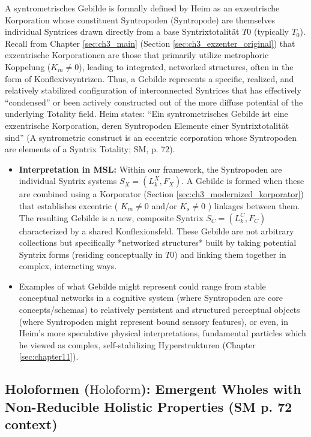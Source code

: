\documentclass[
    12pt,              %
    a4paper,           %
    headings=normal,   %
    twoside=true,      %
    BCOR=8mm,          %
]{scrbook}
\newcommand{\q}[1]{\enquote{#1}}
\newcommand{\syntropode}{\text{Syntropode}}
\newcommand{\syntrixtotalitaet}{T0}
\newcommand{\holoform}{\text{Holoform}}
\begin{document}
A syntrometrisches Gebilde is formally defined by Heim as an exzentrische Korporation whose constituent Syntropoden (\(\syntropode\)) are themselves individual Syntrices drawn directly from a base Syntrixtotalität \(\syntrixtotalitaet\) (typically \(T_0\)). Recall from Chapter \ref{sec:ch3_main} (Section \ref{sec:ch3_exzenter_original}) that exzentrische Korporationen are those that primarily utilize metrophoric Koppelung (\(K_m \neq 0\)), leading to integrated, networked structures, often in the form of Konflexivsyntrizen.
Thus, a Gebilde represents a specific, realized, and relatively stabilized configuration of interconnected Syntrices that has effectively \q{condensed} or been actively constructed out of the more diffuse potential of the underlying Totality field.
Heim states: \q{Ein syntrometrisches Gebilde ist eine exzentrische Korporation, deren Syntropoden Elemente einer Syntrixtotalität sind} (A syntrometric construct is an eccentric corporation whose Syntropoden are elements of a Syntrix Totality; SM, p. 72).
\begin{itemize}
    \item   \textbf{Interpretation in MSL:} Within our framework, the Syntropoden are individual Syntrix systems \(S_X = (L_k^X, F_X)\). A Gebilde is formed when these are combined using a Korporator (Section \ref{sec:ch3_modernized_korporator}) that establishes excentric ( \(K_m \neq 0\) and/or \(K_s \neq 0\) ) linkages between them. The resulting Gebilde is a new, composite Syntrix \(S_C = (L_k^C, F_C)\) characterized by a shared Konflexionsfeld. These Gebilde are not arbitrary collections but specifically *networked structures* built by taking potential Syntrix forms (residing conceptually in \(\syntrixtotalitaet\)) and linking them together in complex, interacting ways.
    \item   Examples of what Gebilde might represent could range from stable conceptual networks in a cognitive system (where Syntropoden are core concepts/schemas) to relatively persistent and structured perceptual objects (where Syntropoden might represent bound sensory features), or even, in Heim's more speculative physical interpretations, fundamental particles which he viewed as complex, self-stabilizing Hyperstrukturen (Chapter \ref{sec:chapter11}).
\end{itemize}

\subsection{Holoformen (\(\holoform\)): Emergent Wholes with Non-Reducible Holistic Properties (SM p. 72 context)}
\label{sec:ch4_holoformen_definition_revised_2} 
\end{document}
